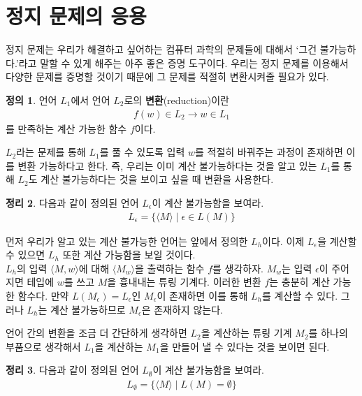 \documentclass[b5paper, 11pt]{book}
\theoremstyle{definition}
\newtheorem{defn}{정의}[chapter]
\newtheorem{thm}[defn]{정리}
\newenvironment{pf*}{\pushQED{\qed}\pf}
{\popQED\endpf}
\begin{document}
\section{정지 문제의 응용}
정지 문제는 우리가 해결하고 싶어하는 컴퓨터 과학의 문제들에 대해서 `그건 불가능하다.'라고 말할 수 있게
해주는 아주 좋은 증명 도구이다. 우리는 정지 문제를 이용해서 다양한 문제를 증명할 것이기 때문에
그 문제를 적절히 변환시켜줄 필요가 있다.
\begin{defn}
    언어 $L_1$에서 언어 $L_2$로의 \textbf{변환}(reduction)이란 
    \begin{align*}
        f(w) \in L_2 \rightarrow w \in L_1 
    \end{align*}
    를 만족하는 계산 가능한 함수 $f$이다.
\end{defn}
$L_2$라는 문제를 통해 $L_1$를 풀 수 있도록 입력 $w$를 적절히 바꿔주는 과정이 존재하면
이를 변환 가능하다고 한다. 즉, 우리는 이미 계산 불가능하다는 것을 알고 있는 $L_1$를 통해
$L_2$도 계산 불가능하다는 것을 보이고 싶을 때 변환을 사용한다. 
\begin{thm}
    다음과 같이 정의된 언어 $L_\epsilon$이 계산 불가능함을 보여라.
    \begin{align*}
        L_\epsilon = \{ \langle M \rangle \;\vert\; \epsilon \in L(M) \}
    \end{align*}
\end{thm}
\begin{pf*}
    먼저 우리가 알고 있는 계산 불가능한 언어는 앞에서 정의한 $L_h$이다. 이제 $L_\epsilon$을
    계산할 수 있으면 $L_h$ 또한 계산 가능함을 보일 것이다. 
    \\ $L_h$의 입력 $\langle M , w\rangle$에 대해 $\langle M_w \rangle$을 출력하는 
    함수 $f$를 생각하자. $M_w$는 입력 $\epsilon$이 주어지면 테입에 $w$를 쓰고 
    $M$을 흉내내는 튜링 기계다. 이러한 변환 $f$는 충분히 계산 가능한 함수다. 
    만약 $L(M_\epsilon) = L_\epsilon$인 $M_\epsilon$이 존재하면 이를 통해 
    $L_h$를 계산할 수 있다. 그러나 $L_h$는 계산 불가능하므로 $M_\epsilon$은 존재하지
    않는다.
\end{pf*}
언어 간의 변환을 조금 더 간단하게 생각하면 $L_2$을 계산하는 튜링 기계 $M_2$를 하나의 
부품으로 생각해서 $L_1$을 계산하는 $M_1$을 만들어 낼 수 있다는 것을 보이면 된다.
\begin{thm}
    다음과 같이 정의된 언어 $L_\emptyset$이 계산 불가능함을 보여라.
    \begin{align*}
        L_\emptyset = \{ \langle M \rangle \;\vert\; L(M) = \emptyset \}
    \end{align*}
\end{thm}
\end{document}

